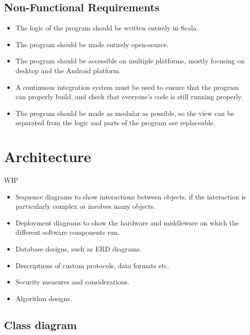 \documentclass[10pt]{extarticle} %
\begin{document}
    \subsection{Non-Functional Requirements}
    \begin{itemize}
        \item The logic of the program should be written entirely in Scala.
        \item The program should be made entirely open-source.
        \item The program should be accessible on multiple platforms, mostly focusing on desktop and the Android platform.
        \item A continuous integration system must be used to ensure that the program can properly build, and check that everyone's code is still running properly.
        \item The program should be made as modular as possible, so the view can be separated from the logic and parts of the program are replaceable.
    \end{itemize}
    \newpage

    \section{Architecture}
    WIP
    \begin{itemize}
        \item Sequence diagrams to show interactions between objects, if the interaction is particularly complex or involves many objects.
        \item Deployment diagrams to show the hardware and middleware on which the different software components run.
        \item Database designs, such as ERD diagrams.
        \item Descriptions of custom protocols, data formats etc.
        \item Security measures and considerations.
        \item Algorithm designs.
    \end{itemize}

    \subsection[class_diagram]{Class diagram}
\end{document}
